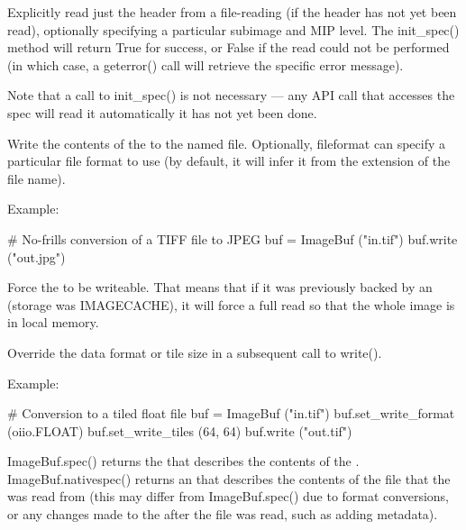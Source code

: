 
Explicitly read just the header from a file-reading \ImageBuf (if the header
has not yet been read), optionally specifying a particular subimage and MIP
level. The {\cf init_spec()} method will return {\cf True} for success, or
{\cf False} if the read could not be performed (in which case, a {\cf
geterror()} call will retrieve the specific error message).

Note that a call to {\cf init_spec()} is not necessary --- any \ImageBuf API
call that accesses the spec will read it automatically it has not yet been
done.
\apiend

Write the contents of the \ImageBuf to the named file.  Optionally, {\cf
fileformat} can specify a particular file format to use (by default, it
will infer it from the extension of the file name).

\noindent Example:
\begin{code}
    # No-frills conversion of a TIFF file to JPEG
    buf = ImageBuf ("in.tif")
    buf.write ("out.jpg")
\end{code}
\apiend

Force the \ImageBuf to be writeable. That means that if it was previously
backed by an \ImageCache (storage was {\cf IMAGECACHE}), it will force a
full read so that the whole image is in local memory.
\apiend


Override the data format or tile size in a subsequent call to {\cf write()}.

\noindent Example:
\begin{code}
    # Conversion to a tiled float file
    buf = ImageBuf ("in.tif")
    buf.set_write_format (oiio.FLOAT)
    buf.set_write_tiles (64, 64)
    buf.write ("out.tif")
\end{code}
\apiend

{\cf ImageBuf.spec()} returns the \ImageSpec that describes the contents of
the \ImageBuf.  {\cf ImageBuf.nativespec()} returns an \ImageSpec that
describes the contents of the file that the \ImageBuf was read from (this
may differ from {\cf ImageBuf.spec()} due to format conversions, or any
changes made to the \ImageBuf after the file was read, such as adding
metadata).

